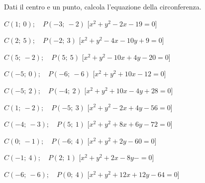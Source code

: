 

\begin{esercizio}\label{ese:}
 Dati il centro e un punto, calcola l'equazione della circonferenza.
 \begin{enumeratea}
  \item  \(C \left (1;~0 \right ); \quad P \left (-3;~-2 \right )\)
   \hfill [\(x^2 + y^2 -2x -19 = 0\)]
  \item  \(C \left (2;~5 \right ); \quad P \left (-2;~3 \right )\)
   \hfill [\(x^2 + y^2 -4x -10y +9 = 0\)]
  \item  \(C \left (5;~-2 \right ); \quad P \left (5;~5 \right )\)
   \hfill [\(x^2 + y^2 -10x +4y -20 = 0\)]
  \item  \(C \left (-5;~0 \right ); \quad P \left (-6;~-6 \right )\)
   \hfill [\(x^2 + y^2 +10x -12 = 0\)]
  \item  \(C \left (-5;~2 \right ); \quad P \left (-4;~2 \right )\)
   \hfill [\(x^2 + y^2 +10x -4y +28 = 0\)]
  \item  \(C \left (1;~-2 \right ); \quad P \left (-5;~3 \right )\)
   \hfill [\(x^2 + y^2 -2x +4y -56 = 0\)]
  \item  \(C \left (-4;~-3 \right ); \quad P \left (5;~1 \right )\)
   \hfill [\(x^2 + y^2 +8x +6y -72 = 0\)]
  \item  \(C \left (0;~-1 \right ); \quad P \left (-6;~4 \right )\)
   \hfill [\(x^2 + y^2 +2y -60 = 0\)]
  \item  \(C \left (-1;~4 \right ); \quad P \left (2;~1 \right )\)
   \hfill [\(x^2 + y^2 +2x -8y - = 0\)]
  \item  \(C \left (-6;~-6 \right ); \quad P \left (0;~4 \right )\)
   \hfill [\(x^2 + y^2 +12x +12y -64 = 0\)]
 \end{enumeratea}
\end{esercizio}


